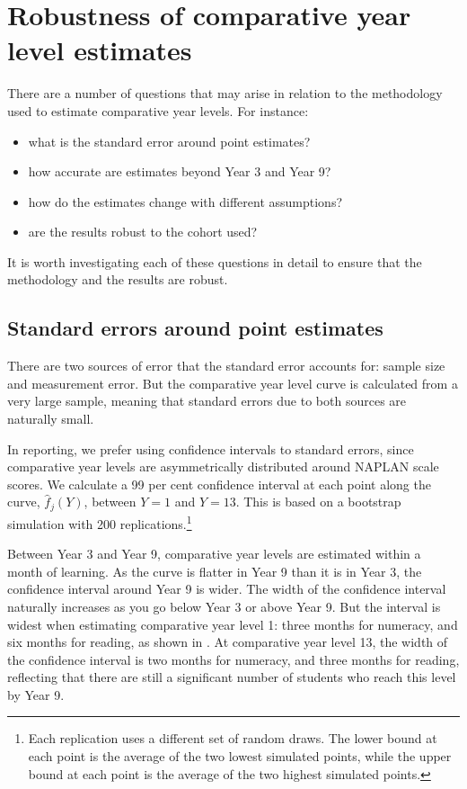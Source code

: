\section{Robustness of comparative year level estimates}

There are a number of questions that may arise in relation to the methodology used to estimate comparative year levels. For instance:
\begin{itemize}
    \item what is the standard error around point estimates?
    \item how accurate are estimates beyond Year 3 and Year 9?
    \item how do the estimates change with different assumptions?
    \item are the results robust to the cohort used?
\end{itemize}

It is worth investigating each of these questions in detail to ensure that the methodology and the results are robust.

\subsection{Standard errors around point estimates}

There are two sources of error that the standard error accounts for: sample size and measurement error. But the comparative year level curve is calculated from a very large sample, meaning that standard errors due to both sources are naturally small.

In reporting, we prefer using confidence intervals to standard errors, since comparative year levels are asymmetrically distributed around NAPLAN scale scores. We calculate a 99 per cent confidence interval at each point along the curve, $\widehat{f}_{j}(Y)$, between $Y=1$ and $Y=13$. This is based on a bootstrap simulation with 200 replications.\footnote{Each replication uses a different set of random draws. The lower bound at each point is the average of the two lowest simulated points, while the upper bound at each point is the average of the two highest simulated points.}

Between Year 3 and Year 9, comparative year levels are estimated within a month of learning. As the curve is flatter in Year 9 than it is in Year 3, the confidence interval around Year 9 is wider. The width of the confidence interval naturally increases as you go below Year 3 or above Year 9. But the interval is widest when estimating comparative year level 1: three months for numeracy, and six months for reading, as shown in . At comparative year level 13, the width of the confidence interval is two months for numeracy, and three months for reading, reflecting that there are still a significant number of students who reach this level by Year 9.

